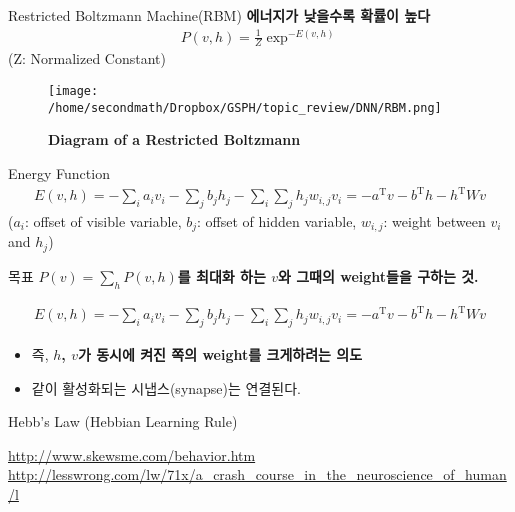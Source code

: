 \documentclass{beamer}
\begin{document}
\begin{frame}{Restricted Boltzmann Machine(RBM)}
\textbf{에너지가 낮을수록 확률이 높다}
\begin{align*}
P(v,h)=\frac{1}{Z}\exp^{-E(v,h)}
\end{align*}
(Z: Normalized Constant)\\
\begin{figure}[!ht]
\centering
\texttt{[image: /home/secondmath/Dropbox/GSPH/topic\_review/DNN/RBM.png]}
\caption{\bf{Diagram of a Restricted Boltzmann\citep{RBMfigure}}}
\end{figure}
\end{frame}

\begin{frame}{Energy Function}
\begin{align*}
E(v,h)= -\sum_i a_i v_i - \sum_j b_j h_j -\sum_i \sum_j h_j w_{i,j} v_i=-a^{\mathrm{T}} v - b^{\mathrm{T}} h -h^{\mathrm{T}} W v
\end{align*}
($a_i$: offset of visible variable, $b_j$: offset of hidden variable, $w_{i,j}$: weight between $v_i$ and $h_j$)
\end{frame}

\begin{frame}{목표}
\textbf{$P(v)=\sum_h P(v,h)$를 최대화 하는 $v$와 그때의 weight들을 구하는 것.}

\begin{align*}
E(v,h)= -\sum_i a_i v_i - \sum_j b_j h_j -\sum_i \sum_j h_j w_{i,j} v_i=-a^{\mathrm{T}} v - b^{\mathrm{T}} h -h^{\mathrm{T}} W v
\end{align*}
\begin{itemize}
  \item 즉, \textbf{$h$, $v$가 동시에 켜진 쪽의 weight를 크게하려는 의도}
  \item 같이 활성화되는 시냅스(synapse)는 연결된다. 
\end{itemize}
\end{frame}

\begin{frame}{Hebb’s Law (Hebbian Learning Rule)}
\begin{figure}
\end{figure}
\url{http://www.skewsme.com/behavior.htm}\\ \url{http://lesswrong.com/lw/71x/a_crash_course_in_the_neuroscience_of_human/l}
\end{frame}
\end{document}
